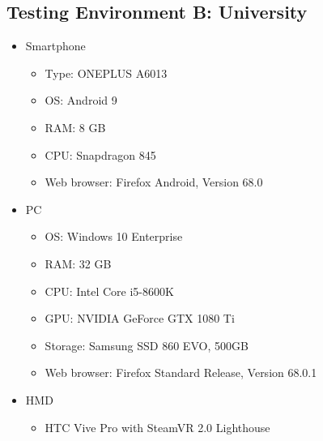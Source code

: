 \begin{appendices}
  \section{Testing Environment B: University}
  \begin{itemize}
    \item Smartphone
    \begin{itemize}
      \item Type: ONEPLUS A6013
      \item \ac{OS}: Android 9
      \item RAM: 8 GB
      \item CPU: Snapdragon 845 %
      \item Web browser: Firefox Android, Version 68.0
    \end{itemize}
    \item \ac{PC}
    \begin{itemize}
      \item \ac{OS}: Windows 10 Enterprise
      \item RAM: 32 GB
      \item CPU: Intel Core i5-8600K %
      \item GPU: NVIDIA GeForce GTX 1080 Ti
      \item Storage: Samsung SSD 860 EVO, 500GB
      \item Web browser: Firefox Standard Release, Version 68.0.1
    \end{itemize}
    \item \ac{HMD}
    \begin{itemize}
      \item HTC Vive Pro with SteamVR 2.0 Lighthouse
    \end{itemize}
  \end{itemize}

  
\end{appendices}